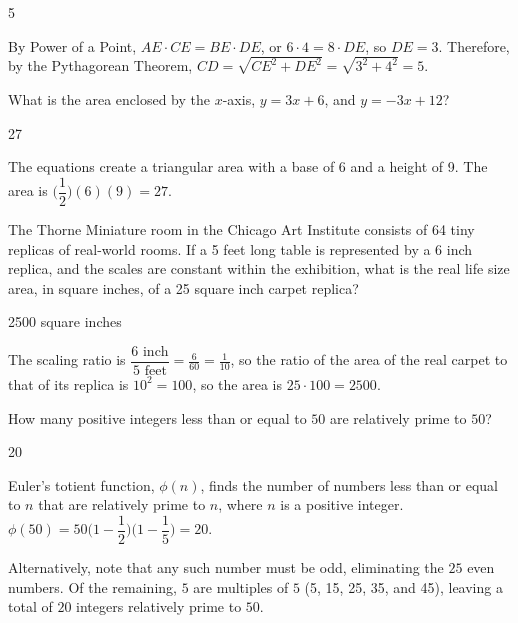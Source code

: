 \documentclass[11pt]{article}
\begin{document}
\begin{answer}
5
\end{answer}

\begin{solution}
By Power of a Point, $AE \cdot CE = BE \cdot DE$, or $6 \cdot 4 = 8 \cdot DE$, so $DE = 3$. Therefore, by the Pythagorean Theorem, $CD = \sqrt{CE^2 + DE^2} = \sqrt{3^2 + 4^2} = 5$.
\end{solution}

\begin{problem}%
What is the area enclosed by the $x$-axis, $y=3x+6$, and $y=-3x+12$?
\end{problem}

\begin{answer}
27
\end{answer}
 
\begin{solution}
The equations create a triangular area with a base of 6 and a height of 9. The area is $\bigg(\dfrac{1}{2}\bigg)(6)(9) = 27$.
\end{solution}

\begin{problem} %
The Thorne Miniature room in the Chicago Art Institute consists of 64 tiny replicas of real-world rooms. If a 5 feet long table is represented by a 6 inch replica, and the scales are constant within the exhibition, what is the real life size area, in square inches, of a 25 square inch carpet replica?
\end{problem}

\begin{answer}
2500 square inches
\end{answer}

\begin{solution}
The scaling ratio is $\dfrac{6 \text{ inch}}{5 \text{ feet}} = \frac{6}{60} = \frac{1}{10}$, so the ratio of the area of the real carpet to that of its replica is $10^2 = 100$, so the area is $25 \cdot 100 = 2500$.
\end{solution}


\begin{problem}%
How many positive integers less than or equal to $50$ are relatively prime to $50$?
\end{problem}

\begin{answer}
20
\end{answer}

\begin{solution}
Euler's totient function, $\phi(n)$, finds the number of numbers less than or equal to $n$ that are relatively prime to $n$, where $n$ is a positive integer. $\phi(50) = 50\bigg(1-\dfrac{1}{2}\bigg)\bigg(1-\dfrac{1}{5}\bigg) = 20$.

Alternatively, note that any such number must be odd, eliminating the $25$ even numbers. Of the remaining, $5$ are multiples of $5$ (5, 15, 25, 35, and 45), leaving a total of $20$ integers relatively prime to $50$.
\end{solution}
\end{document}
